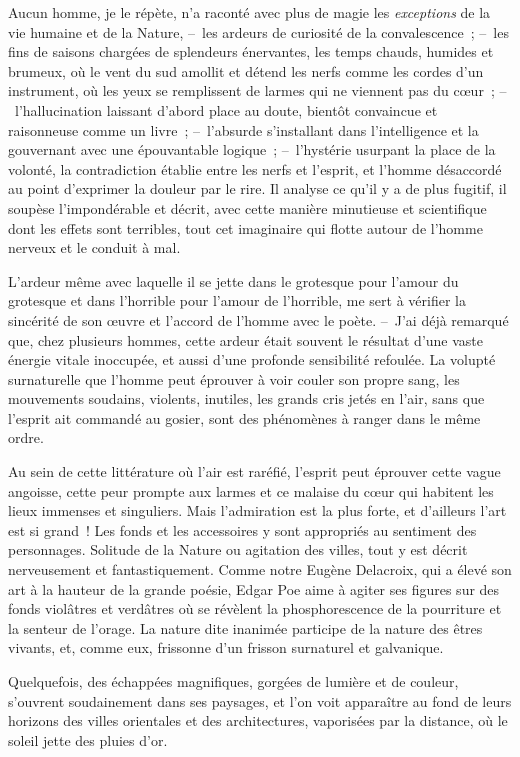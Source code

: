 \documentclass[french,twoside]{book} %
\begin{document}
Aucun homme, je le répète, n’a raconté avec plus de magie les \emph{exceptions} de la vie humaine et de la Nature, – les ardeurs de curiosité de la convalescence ; – les fins de saisons chargées de splendeurs énervantes, les temps chauds, humides et brumeux, où le vent du sud amollit et détend les nerfs comme les cordes d’un instrument, où les yeux se remplissent de larmes qui ne viennent pas du cœur ; – l’hallucination laissant d’abord place au doute, bientôt convaincue et raisonneuse comme un livre ; – l’absurde s’installant dans l’intelligence et la gouvernant avec une épouvantable logique ; – l’hystérie usurpant la place de la volonté, la contradiction établie entre les nerfs et l’esprit, et l’homme désaccordé au point d’exprimer la douleur par le rire. Il analyse ce qu’il y a de plus fugitif, il soupèse l’impondérable et décrit, avec cette manière minutieuse et scientifique dont les effets sont terribles, tout cet imaginaire qui flotte autour de l’homme nerveux et le conduit à mal.\par
L’ardeur même avec laquelle il se jette dans le grotesque pour l’amour du grotesque et dans l’horrible pour l’amour de l’horrible, me sert à vérifier la sincérité de son œuvre et l’accord de l’homme avec le poète. – J’ai déjà remarqué que, chez plusieurs hommes, cette ardeur était souvent le résultat d’une vaste énergie vitale inoccupée, et aussi d’une profonde sensibilité refoulée. La volupté surnaturelle que l’homme peut éprouver à voir couler son propre sang, les mouvements soudains, violents, inutiles, les grands cris jetés en l’air, sans que l’esprit ait commandé au gosier, sont des phénomènes à ranger dans le même ordre.\par
Au sein de cette littérature où l’air est raréfié, l’esprit peut éprouver cette vague angoisse, cette peur prompte aux larmes et ce malaise du cœur qui habitent les lieux immenses et singuliers. Mais l’admiration est la plus forte, et d’ailleurs l’art est si grand ! Les fonds et les accessoires y sont appropriés au sentiment des personnages. Solitude de la Nature ou agitation des villes, tout y est décrit nerveusement et fantastiquement. Comme notre Eugène Delacroix, qui a élevé son art à la hauteur de la grande poésie, Edgar Poe aime à agiter ses figures sur des fonds violâtres et verdâtres où se révèlent la phosphorescence de la pourriture et la senteur de l’orage. La nature dite inanimée participe de la nature des êtres vivants, et, comme eux, frissonne d’un frisson surnaturel et galvanique.\par
Quelquefois, des échappées magnifiques, gorgées de lumière et de couleur, s’ouvrent soudainement dans ses paysages, et l’on voit apparaître au fond de leurs horizons des villes orientales et des architectures, vaporisées par la distance, où le soleil jette des pluies d’or.\par
\end{document}
